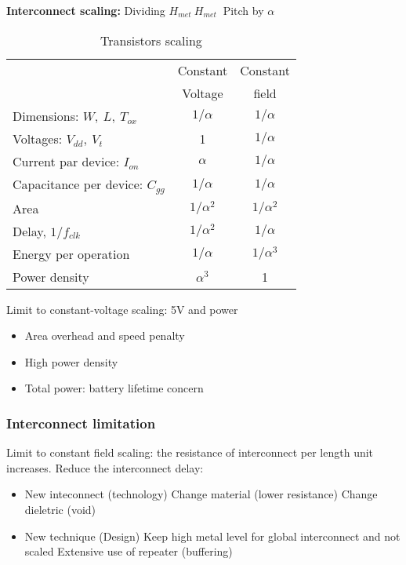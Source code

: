 \textbf{Interconnect scaling:} Dividing \(H_{met}\ H_{met} \ \) Pitch by \(\alpha\)

\begin{table}[!ht]
  \centering
  \begin{tabular}{|l|c|c|}
    \hline
    &Constant&Constant\\
    &Voltage&field\\
    \hline
    \hline
    Dimensions: \(W,\ L,\ T_{ox}\)& \(1/\alpha\) & \(1/\alpha\)\\
    \hline
    Voltages: \(V_{dd},\ V_t\)&1 & \(1/\alpha\)\\
    \hline
    Current par device: \(I_{on}\)&\(\alpha\) & \(1/\alpha\)\\
    \hline
    Capacitance per device: \(C_{gg}\)& \(1/\alpha\) & \(1/\alpha\)\\
    \hline
    Area&\(1/\alpha^2\) & \(1/\alpha^2\)\\
    \hline
    Delay, \(1/f_{clk}\)& \(1/\alpha^2 \) & \(1/\alpha\)\\
    \hline
    Energy per operation& \(1/\alpha\) & \(1/\alpha^3\)\\
    \hline
    Power density&\(\alpha^3\) & 1\\
    \hline
  \end{tabular}
  \caption{Transistors scaling}
  \label{Transitors-scaling}
\end{table}

Limit to constant-voltage scaling: 5V and power
\begin{itemize}
  \item Area overhead and speed penalty
  \item High power density
  \item Total power: battery lifetime concern
\end{itemize}
\bigbreak

\subsubsection{Interconnect limitation}
Limit to constant field scaling: the resistance of interconnect per length unit increases. Reduce the interconnect delay:
\begin{itemize}
  \item New inteconnect (technology)
    \subitem Change material (lower resistance)
    \subitem Change dieletric (void)
  \item New technique (Design)
    \subitem Keep high metal level for global interconnect and not scaled
    \subitem Extensive use of repeater (buffering)
\end{itemize}

